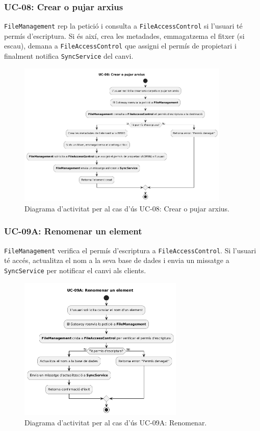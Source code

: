 \subsubsection{UC-08: Crear o pujar arxius}
\texttt{FileManagement} rep la petició i consulta a \texttt{FileAccessControl} si l'usuari té permís d'escriptura. Si és així, crea les metadades, emmagatzema el fitxer (si escau), demana a \texttt{FileAccessControl} que assigni el permís de propietari i finalment notifica \texttt{SyncService} del canvi.

\begin{figure}[H]
    \centering
    \includegraphics[width=0.9\textwidth]{Figures/ad_UC08.png}
    \caption{Diagrama d'activitat per al cas d'ús UC-08: Crear o pujar arxius.}
    \label{fig:ad_uc08_app}
\end{figure}

\subsubsection{UC-09A: Renomenar un element}
\texttt{FileManagement} verifica el permís d'escriptura a \texttt{FileAccessControl}. Si l'usuari té accés, actualitza el nom a la seva base de dades i envia un missatge a \texttt{SyncService} per notificar el canvi als clients.

\begin{figure}[H]
    \centering
    \includegraphics[width=0.7\textwidth]{Figures/ad_UC09A.png}
    \caption{Diagrama d'activitat per al cas d'ús UC-09A: Renomenar.}
    \label{fig:ad_uc09a_app}
\end{figure}

